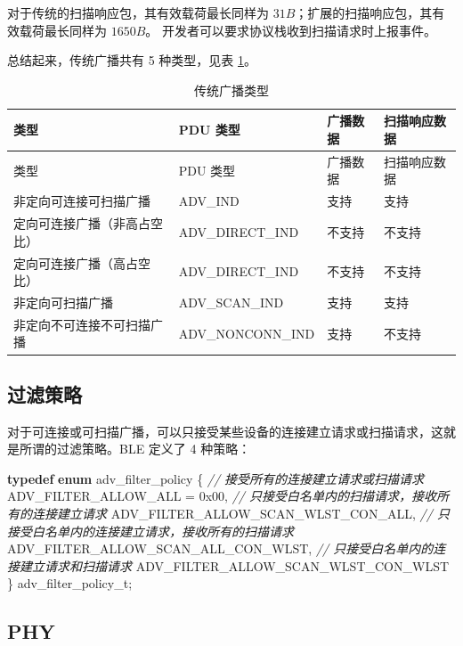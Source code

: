 \documentclass[
  12pt,
]{book}
\newenvironment{Shaded}{\begin{snugshade}}{\end{snugshade}}
\newcommand{\BaseNTok}[1]{\textcolor[rgb]{0.00,0.00,0.81}{#1}}
\newcommand{\CommentTok}[1]{\textcolor[rgb]{0.56,0.35,0.01}{\textit{#1}}}
\newcommand{\KeywordTok}[1]{\textcolor[rgb]{0.13,0.29,0.53}{\textbf{#1}}}
\newcommand{\NormalTok}[1]{#1}
\begin{document}
对于传统的扫描响应包，其有效载荷最长同样为 \(31B\)；扩展的扫描响应包，其有效载荷最长同样为 \(1650B\)。
开发者可以要求协议栈收到扫描请求时上报事件。

总结起来，传统广播共有 5 种类型，见表 \ref{tab:ch1-legacy-adv-types}。

\begin{longtable}[]{@{}llll@{}}
\caption{\label{tab:ch1-legacy-adv-types} 传统广播类型}\tabularnewline
\toprule
类型 & PDU 类型 & 广播数据 & 扫描响应数据\tabularnewline
\midrule
\endfirsthead
\toprule
类型 & PDU 类型 & 广播数据 & 扫描响应数据\tabularnewline
\midrule
\endhead
非定向可连接可扫描广播 & ADV\_IND & 支持 & 支持\tabularnewline
定向可连接广播（非高占空比） & ADV\_DIRECT\_IND & 不支持 & 不支持\tabularnewline
定向可连接广播（高占空比） & ADV\_DIRECT\_IND & 不支持 & 不支持\tabularnewline
非定向可扫描广播 & ADV\_SCAN\_IND & 支持 & 支持\tabularnewline
非定向不可连接不可扫描广播 & ADV\_NONCONN\_IND & 支持 & 不支持\tabularnewline
\bottomrule
\end{longtable}

\hypertarget{ch1-adv-filter}{%
\subsection{过滤策略}\label{ch1-adv-filter}}

对于可连接或可扫描广播，可以只接受某些设备的连接建立请求或扫描请求，这就是所谓的过滤策略。BLE 定义了 4 种策略：

\begin{Shaded}
\begin{Highlighting}[]
\KeywordTok{typedef} \KeywordTok{enum}\NormalTok{ adv_filter_policy}
\NormalTok{\{}
    \CommentTok{// 接受所有的连接建立请求或扫描请求}
\NormalTok{    ADV_FILTER_ALLOW_ALL    = }\BaseNTok{0x00}\NormalTok{,}
    \CommentTok{// 只接受白名单内的扫描请求，接收所有的连接建立请求}
\NormalTok{    ADV_FILTER_ALLOW_SCAN_WLST_CON_ALL,}
    \CommentTok{// 只接受白名单内的连接建立请求，接收所有的扫描请求}
\NormalTok{    ADV_FILTER_ALLOW_SCAN_ALL_CON_WLST,}
    \CommentTok{// 只接受白名单内的连接建立请求和扫描请求}
\NormalTok{    ADV_FILTER_ALLOW_SCAN_WLST_CON_WLST}
\NormalTok{\} adv_filter_policy_t;}
\end{Highlighting}
\end{Shaded}

\hypertarget{phy}{%
\subsection{PHY}\label{phy}}
\end{document}

